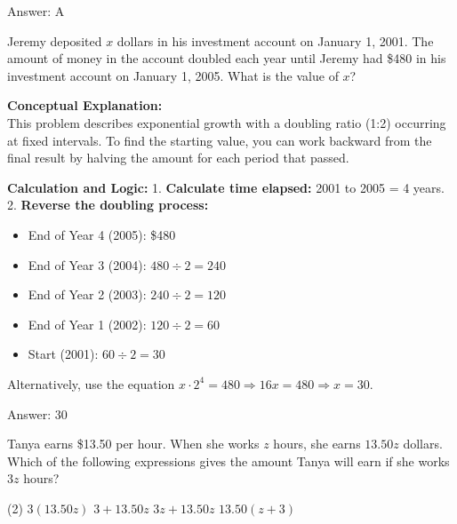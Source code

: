\documentclass[11pt,paper=a4,answers]{exam}
\begin{document}
\begin{questions}
\begin{solution}
\vspace{30pt}

Answer: \colorbox{yellow!100}{A}
\end{solution}

\vspace{60pt}

\question
Jeremy deposited $x$ dollars in his investment account on January 1, 2001. The amount of money in the account doubled each year until Jeremy had \$480 in his investment account on January 1, 2005. What is the value of $x$?

\begin{solution}
\textbf{Conceptual Explanation:} \\
This problem describes exponential growth with a doubling ratio (1:2) occurring at fixed intervals. To find the starting value, you can work backward from the final result by halving the amount for each period that passed.

\vspace{30pt}

\textbf{Calculation and Logic:} 
1. \textbf{Calculate time elapsed:} 2001 to 2005 = 4 years. 
2. \textbf{Reverse the doubling process:} 
\begin{itemize}
    \item End of Year 4 (2005): \$480
    \item End of Year 3 (2004): $480 \div 2 = 240$
    \item End of Year 2 (2003): $240 \div 2 = 120$
    \item End of Year 1 (2002): $120 \div 2 = 60$
    \item Start (2001): $60 \div 2 = 30$
\end{itemize}

\vspace{15pt}

Alternatively, use the equation $x \cdot 2^4 = 480 \Rightarrow 16x = 480 \Rightarrow x = 30$.

\vspace{30pt}

Answer: \colorbox{yellow!100}{30}
\end{solution}

\question
Tanya earns \$13.50 per hour. When she works $z$ hours, she earns $13.50z$ dollars. Which of the following expressions gives the amount Tanya will earn if she works $3z$ hours?
\begin{tasks}(2)
    \task $3(13.50z)$
    \task $3 + 13.50z$
    \task $3z + 13.50z$
    \task $13.50(z + 3)$
\end{tasks}


\end{questions}
\end{document}
